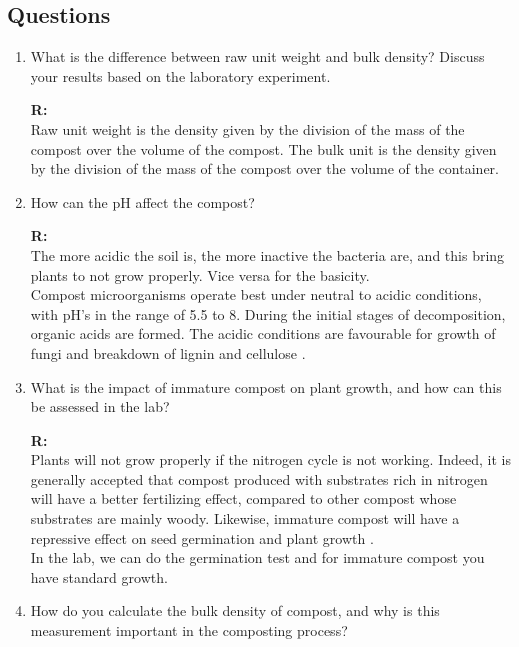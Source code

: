 \documentclass{article}
\begin{document}
\subsection{Questions}
\begin{enumerate}
    \item What is the difference between raw unit weight and bulk density? Discuss your
        results based on the laboratory experiment.

        \textbf{R:\\}
        Raw unit weight is the density given by the division of the mass of the compost
        over the volume of the compost. The bulk unit is the density given by the division
        of the mass of the compost over the volume of the container.

    \item How can the pH affect the compost?
    
        \textbf{R:\\}
        The more acidic the soil is, the more inactive the bacteria are, and this bring
        plants to not grow properly. Vice versa for the basicity.\\
        Compost microorganisms operate best under neutral to acidic conditions, with pH's
        in the range of 5.5 to 8. During the initial stages of decomposition, organic
        acids are formed. The acidic conditions are favourable for growth of fungi and
        breakdown of lignin and cellulose \parencite{cornell}.

    \item What is the impact of immature compost on plant growth, and how can this be
        assessed in the lab?

        \textbf{R:\\}
        Plants will not grow properly if the nitrogen cycle is not working. Indeed, it is
        generally accepted that compost produced with substrates rich in nitrogen will
        have a better fertilizing effect, compared to other compost whose substrates are
        mainly woody. Likewise, immature compost will have a repressive effect on seed
        germination and plant growth \parencite{tamakloe2021}.
        \\
        In the lab, we can do the germination test and for immature compost you have
        standard growth.

    \item How do you calculate the bulk density of compost, and why is this measurement
        important in the composting process?


\end{enumerate}
\end{document}
